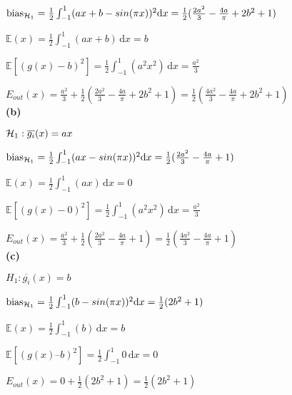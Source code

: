 $\text{bias}_{{\cal H}_1} = \frac{1}{2} \int_{-1}^{1} (ax + b - sin(\pi x))^2 \mathrm{d}x = \frac{1}{2} (\frac{2a^2}{3} - \frac{4a}{\pi}+ 2b^2 + 1)$

$\mathbb{E}(x) = \frac{1}{2} \int_{-1}^{1} \! (ax + b)\, \mathrm{d}x = b$

$\mathbb{E}[( g(x) - b)^2] = \frac{1}{2} \int_{-1}^{1} \! (a^2x^2)\, \mathrm{d}x = \frac{a^2}{3}$

$E_{out} (x) = \frac{a^2}{3} + \frac{1}{2} (\frac{2a^2}{3} - \frac{4a}{\pi}+ 2b^2 + 1)
= \frac{1}{2} (\frac{4a^2}{3} - \frac{4a}{\pi}+ 2b^2 + 1)$
\\

\textbf{(b)} 

$\mathcal{H}_1: \overline{g_i}(x) = ax$

$\text{bias}_{{\cal H}_1} = \frac{1}{2} \int_{-1}^{1} (ax - sin(\pi x))^2 \mathrm{d}x = \frac{1}{2} (\frac{2a^2}{3} - \frac{4a}{\pi}+ 1)$

$\mathbb{E}(x) = \frac{1}{2} \int_{-1}^{1} \! (ax)\, \mathrm{d}x = 0$

$\mathbb{E}[( g(x)-0)^2] = \frac{1}{2} \int_{-1}^{1} \! (a^2x^2)\, \mathrm{d}x = \frac{a^2}{3}$

$E_{out} (x) = \frac{a^2}{3} + \frac{1}{2} (\frac{2a^2}{3} - \frac{4a}{\pi}+ 1)
= \frac{1}{2} (\frac{4a^2}{3} - \frac{4a}{\pi}+ 1)$
\\

\textbf{(c)}
 
$H_1: \overline{g_i}(x) = b$


$\text{bias}_{{\cal H}_1} = \frac{1}{2} \int_{-1}^{1} (b - sin(\pi x))^2 \mathrm{d}x = \frac{1}{2} (2b^2 + 1)$

$\mathbb{E}(x) = \frac{1}{2} \int_{-1}^{1} \! (b)\, \mathrm{d}x = b$

$\mathbb{E}[( g(x) – b)^2] = \frac{1}{2} \int_{-1}^{1} \! 0\, \mathrm{d}x = 0$

$E_{out} (x) = 0 + \frac{1}{2} (2b^2 + 1)
= \frac{1}{2} (2b^2 + 1)$

